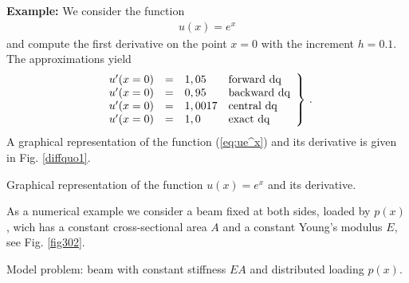 {\bf Example:} We consider the function
%
\begin{eqnarray}
u(x) = e^x
\label{eq:ue^x}
\end{eqnarray}
%
and compute the first derivative on the point $x=0$ with the
increment $h=0.1$. 
The approximations yield
%
\begin{eqnarray}
\left.
\begin{array}{lcll}
u'(x=0) & = & 1,05   & \textnormal{forward dq} \\
u'(x=0) & = & 0,95   & \textnormal{backward dq} \\
u'(x=0) & = & 1,0017 & \textnormal{central dq} \\
u'(x=0) & = & 1,0    & \textnormal{exact dq} \\
\end{array}
\right\} \, .
\end{eqnarray}
%
A graphical representation of the function (\ref{eq:ue^x}) 
and its derivative is given in Fig. \ref{diffquo1}.
% 
\begin{Figure}[htb]
\begin{center}
\caption{Graphical representation of the function 
$u(x)=e^x$ and its derivative.}
\label{diffquo1}
\end{center}
\end{Figure}
%
















\clearpage
{}
%
As a numerical example we consider a beam fixed at 
both sides, loaded by $p(x)$, wich has a constant 
cross-sectional area $A$ and a constant Young's 
modulus $E$, see Fig. \ref{fig302}. 

\begin{Figure}[htb]
\begin{center}

\caption{Model problem: beam with constant stiffness $EA$ 
and distributed loading $p(x)$.} 
\label{fig302}
\end{center}
\end{Figure}%


